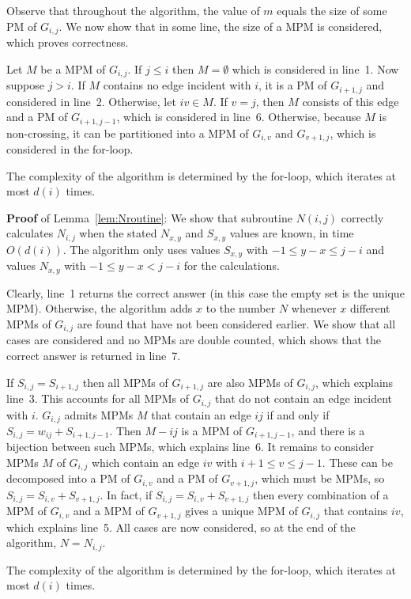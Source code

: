 \documentclass{llncs}
\newcommand{\QED}{\hspace*{\fill}{$\Box$}\medskip}
\begin{document}
Observe that throughout the algorithm, the value of $m$ equals the size of some PM of $G_{i,j}$.
We now show that in some line, the size of a MPM is considered, which proves correctness.


Let $M$ be a MPM of $G_{i,j}$. If $j\leq i$ then $M=\emptyset$ which is considered in line~1. Now suppose $j>i$. If $M$ contains no edge incident with $i$, it is a PM of $G_{i+1,j}$ and considered in line~2. Otherwise, let $iv\in M$. If $v=j$, then $M$ consists of this edge and a PM of $G_{i+1,j-1}$, which is considered in line~6. Otherwise, because $M$ is non-crossing, it can be partitioned into a MPM of $G_{i,v}$ and $G_{v+1,j}$, which is considered in the for-loop.

The complexity of the algorithm is determined by the for-loop, which iterates at most $d(i)$ times.
\QED

{\bf Proof} of Lemma~\ref{lem:Nroutine}:
We show that subroutine $N(i,j)$ correctly calculates $N_{i,j}$ when the stated $N_{x,y}$ and $S_{x,y}$ values are known, in time $O(d(i))$.
The algorithm only uses values $S_{x,y}$ with $-1\leq y-x\leq j-i$ and values $N_{x,y}$ with $-1\leq y-x<j-i$ for the calculations. 

Clearly, line~1 returns the correct answer (in this case the empty set is the unique MPM). Otherwise, the algorithm adds $x$ to the number $N$ whenever $x$ different MPMs of $G_{i,j}$ are found that have not been considered earlier. We show that all cases are considered and no MPMs are double counted, which shows that the correct answer is returned in line~7.

If $S_{i,j}=S_{i+1,j}$ then all MPMs of $G_{i+1,j}$ are also MPMs of $G_{i,j}$, which explains line~3. This accounts for all MPMs of $G_{i,j}$ that do not contain an edge incident with $i$. $G_{i,j}$ admits MPMs $M$ that contain an edge $ij$ if and only if $S_{i,j}=w_{ij}+S_{i+1,j-1}$. Then $M-ij$ is a MPM of $G_{i+1,j-1}$, and there is a bijection between such MPMs, which explains line~6. It remains to consider MPMs $M$ of $G_{i,j}$ which contain an edge $iv$ with $i+1\leq v \leq j-1$. 
These can be decomposed into a PM of $G_{i,v}$ and a PM of $G_{v+1,j}$, which must be MPMs, so $S_{i,j}=S_{i,v}+S_{v+1,j}$. In fact, if $S_{i,j}=S_{i,v}+S_{v+1,j}$ then every combination of a MPM of $G_{i,v}$ and a MPM of $G_{v+1,j}$ gives a unique MPM of $G_{i,j}$ that contains $iv$, which explains line~5.
All cases are now considered, so at the end of the algorithm, $N=N_{i,j}$.

The complexity of the algorithm is determined by the for-loop, which iterates at most $d(i)$ times.
\QED
\end{document}
